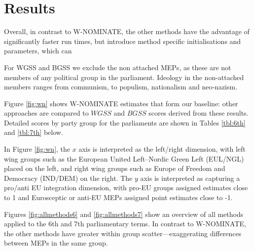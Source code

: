 \documentclass{llncs}
\begin{document}


\section{Results}
\label{sec:results}

Overall, in contrast to W-NOMINATE, the other methods have the advantage of significantly faster run times, but introduce method specific initialisations and parameters, which can 

For WGSS and BGSS we exclude the non attached MEPs, as these are not members of any political group in the parliament. Ideology in the non-attached members ranges from communism, to populism, nationalism and neo-nazism.

Figure \ref{fig:wn} shows W-NOMINATE estimates that form our baseline: other approaches are compared to $WGSS$ and $BGSS$ scores derived from these results. Detailed scores by party group for the parliaments are shown in Tables \ref{tbl:6th} and \ref{tbl:7th} below.

In Figure \ref{fig:wn}, the $x$ axis is interpreted as the left/right dimension, with left wing groups such as the European United Left–Nordic Green Left (EUL/NGL) placed on the left, and right wing groups such as Europe of Freedom and Democracy (IND/DEM) on the right. The $y$ axis is interpreted as capturing a pro/anti EU integration dimension, with pro-EU groups assigned estimates close to 1 and Eurosceptic or anti-EU MEPs assigned point estimates close to -1.

Figures \ref{fig:allmethods6} and \ref{fig:allmethods7} show an overview of all methods applied to the 6th and 7th parliamentary terms. In contrast to W-NOMINATE, the other methods have greater within group scatter---exaggerating differences between MEPs in the same group.
\end{document}
